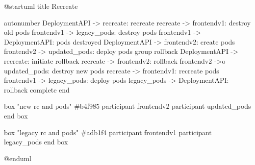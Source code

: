 @startuml
title Recreate

autonumber
DeploymentAPI -> recreate: recreate
recreate -> frontendv1: destroy old pods
frontendv1 -> legacy_pods: destroy pods
frontendv1 -> DeploymentAPI: pods destroyed
DeploymentAPI -> frontendv2: create pods
frontendv2 -> updated_pods: deploy pods
group rollback
  DeploymentAPI -> recreate: initiate rollback
  recreate -> frontendv2: rollback
  frontendv2 ->o updated_pods: destroy new pods
  recreate -> frontendv1: recreate pods
  frontendv1 -> legacy_pods: deploy pods
  legacy_pods -> DeploymentAPI: rollback complete
end

box "new rc and pods" #b4f985
  participant frontendv2
  participant updated_pods
end box

box "legacy rc and pods" #adb1f4
  participant frontendv1
  participant legacy_pods
end box

@enduml
